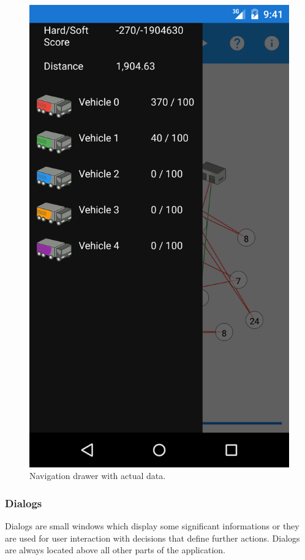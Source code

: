 \begin{figure}[h!]
    \centering
    \includegraphics[scale=0.15]{fig/nav_drawer.png}
    \caption{Navigation drawer with actual data.}
    \label{NavigationDrawerFigure}
\end{figure}

\subsubsection{Dialogs}
Dialogs are small windows which display some significant informations or they are used for user interaction with
decisions that define further actions. Dialogs are always located above all other parts of the application.

